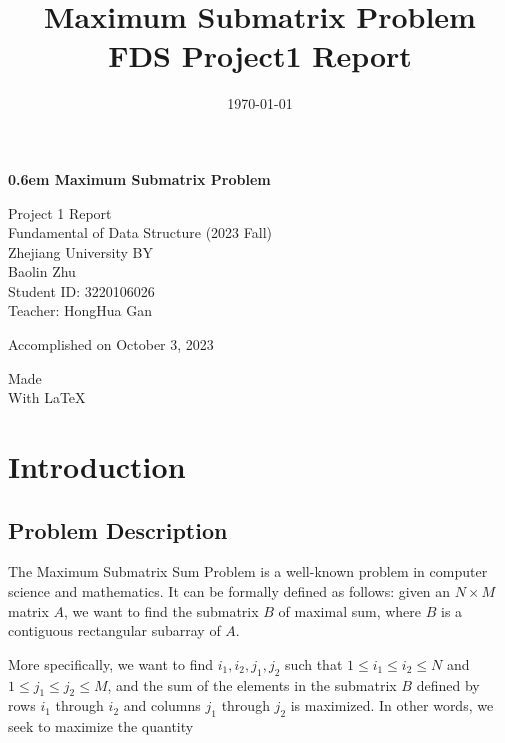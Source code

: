 \documentclass[a4paper,oneside]{book}
\title{
    Maximum Submatrix Problem \\
    \large FDS Project1 Report}
\author{}
\date{\today}
\begin{document}
\clearpage
\newcommand\nbvspace[1][3]{\vspace*{\stretch{#1}}}
\newcommand\nbstretchyspace{\spaceskip0.5em plus 0.25em minus 0.25em}
\newcommand{\nbtitlestretch}{\spaceskip0.6em}
\pagestyle{empty}
\begin{center}
    \bfseries
    \nbvspace[1]
    \Huge
    {\nbtitlestretch\huge
        Maximum Submatrix Problem}

    \nbvspace[1]
    \normalsize

    Project 1 Report\\
    Fundamental of Data Structure (2023 Fall)\\
    Zhejiang University
    \nbvspace[1]
    \small BY\\
    \Large Baolin Zhu\\[0.5em]
    \footnotesize Student ID: 3220106026\\
    Teacher: HongHua Gan

    \nbvspace[2]
    Accomplished on October 3, 2023
    \nbvspace[3]
    \normalsize

    Made\\
    \large
    With \LaTeX
    \nbvspace[1]
\end{center}

\tableofcontents

\chapter{Introduction}

\section{Problem Description}

The Maximum Submatrix Sum Problem is a well-known problem in computer science
and mathematics. It can be formally defined as follows: given an $N \times M$
matrix $A$, we want to find the submatrix $B$ of maximal sum, where $B$ is a
contiguous rectangular subarray of $A$.

More specifically, we want to find $i_1, i_2, j_1, j_2$ such that $1 \leq i_1
    \leq i_2 \leq N$ and $1 \leq j_1 \leq j_2 \leq M$, and the sum of the elements
in the submatrix $B$ defined by rows $i_1$ through $i_2$ and columns $j_1$
through $j_2$ is maximized. In other words, we seek to maximize the quantity
\end{document}
